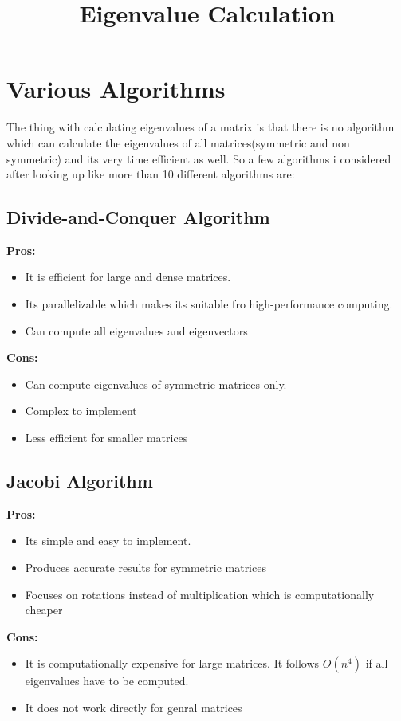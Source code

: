 \documentclass[12pt,oneside,letterpaper,english]{article}
\title{Eigenvalue Calculation} %
\begin{document}


\newpage
\tableofcontents

\newpage
\section{Various Algorithms}
\noindent The thing with calculating eigenvalues of a matrix is that there is no algorithm which can calculate the eigenvalues of all matrices(symmetric and non symmetric) and its very time efficient as well. So a few algorithms i considered after looking up like more than 10 different algorithms are:
\subsection{Divide-and-Conquer Algorithm}
\textbf{Pros:}
\begin{itemize}
    \item It is efficient for large and dense matrices.
    \item Its parallelizable which makes its suitable fro high-performance computing.
    \item Can compute all eigenvalues and eigenvectors
\end{itemize}


\textbf{Cons:}
\begin{itemize}
    \item Can compute eigenvalues of symmetric matrices only.
    \item Complex to implement
    \item Less efficient for smaller matrices
\end{itemize}

\subsection{Jacobi Algorithm}
\textbf{Pros:}
\begin{itemize}
    \item Its simple and easy to implement.
    \item Produces accurate results for symmetric matrices
    \item Focuses on rotations instead of multiplication which is computationally cheaper
\end{itemize}
\textbf{Cons:}
\begin{itemize}
    \item It is computationally expensive for large matrices. It follows $O(n^4)$ if all eigenvalues have to be computed.
    \item It does not work directly for genral matrices
\end{itemize}
\end{document}
